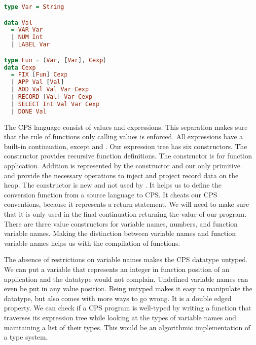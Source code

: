 \begin{lstlisting}[language=Haskell]
type Var = String

data Val
  = VAR Var
  | NUM Int
  | LABEL Var

type Fun = (Var, [Var], Cexp)
data Cexp
  = FIX [Fun] Cexp
  | APP Val [Val]
  | ADD Val Val Var Cexp
  | RECORD [Val] Var Cexp
  | SELECT Int Val Var Cexp
  | DONE Val
\end{lstlisting}

The \ac{CPS} language consist of values and expressions. This separation makes sure that the rule of functions only calling values is enforced. All expressions have a built-in continuation, except  and . Our expression tree has six constructors. The  constructor provides recursive function definitions. The  constructor is for function application. Addition is represented by the  constructor and our only primitive.  and  provide the necessary operations to inject and project record data on the heap. The  constructor is new and not used by \citeauthor{DBLP:books/daglib/0022396}. It helps us to define the conversion function from a source language to \ac{CPS}. It cheats our \ac{CPS} conventions, because it represents a return statement. We will need to make sure that it is only used in the final continuation returning the value of our program. There are three value constructors for variable names, numbers, and function variable names. Making the distinction between variable names and function variable names helps us with the compilation of functions. 

The absence of restrictions on variable names makes the \ac{CPS} datatype untyped. We can put a variable that represents an integer in function position of an application and the datatype would not complain. Undefined variable names can even be put in any value position. Being untyped makes it easy to manipulate the datatype, but also comes with more ways to go wrong. It is a double edged property. We can check if a \ac{CPS} program is well-typed by writing a function that traverses its expression tree while looking at the types of variable names and maintaining a list of their types. This would be an algorithmic implementation of a type system.

